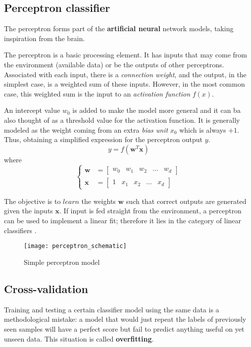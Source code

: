 \subsection{Perceptron classifier}
The perceptron forms part of the \textbf{artificial neural} network models, taking inspiration from the brain.

The perceptron is a basic processing element. It has inputs that may come from the environment (available data) or be the outputs of other perceptrons. Associated with each input, there is a \textit{connection weight}, and the output, in the simplest case, is a weighted sum of these inputs. However, in the most common case, this weighted sum is the input to an \textit{activation function} $f(x)$.

An intercept value $w_0$ is added to make the model more general and it can ba also thought of as a threshold value for the activation function. It is generally modeled as the weight coming from an extra \textit{bias unit} $x_0$ which is always $+1$. Thus, obtaining a simplified expression for the perceptron output $y$.
\begin{equation}
y = f({\boldsymbol{w}^T} \boldsymbol{x})
\end{equation}
where
\begin{equation*}
\begin{cases}
\boldsymbol{w} &= \begin{bmatrix} 	w_0 & w_1 & w_2 & \dots & w_d 	\end{bmatrix} \\
\boldsymbol{x} &= \begin{bmatrix} 	1 & x_1 & x_2 & \dots & x_d 	\end{bmatrix}
\end{cases}
\end{equation*}

The objective is to $learn$ the weights $\boldsymbol{w}$ such that correct outputs are generated given the inputs $\boldsymbol{x}$. If input is fed straight from the environment, a perceptron can be used to implement a linear fit; therefore it lies in the category of linear classifiers \cite{intro-2-ml-Alpaydm}.

\begin{figure}[]
	\centering
	\texttt{[image: perceptron\_schematic]}
	\caption{Simple perceptron model}
	\label{fig:perceptron_schematic}
\end{figure}

\subsection{Cross-validation}
Training and testing a certain classifier model using the same data is a methodological mistake: a model that would just repeat the labels of previously seen samples will have a perfect score but fail to predict anything useful on yet unseen data. This situation is called \textbf{overfitting}. 

